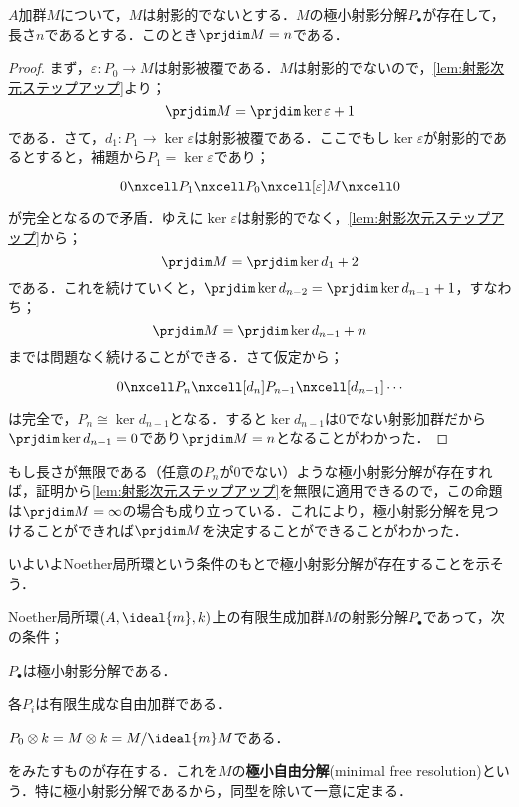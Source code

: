\begin{prop}
	$A$加群$M$について，$M$は射影的でないとする．$M$の極小射影分解$P_\bullet$が存在して，長さ$n$であるとする．このとき$\prjdim M=n$である．
\end{prop}

\begin{proof}
	まず，$\varepsilon:P_0\to M$は射影被覆である．$M$は射影的でないので，\ref{lem:射影次元ステップアップ}より；
	\[\prjdim M=\prjdim\ker\varepsilon+1\]
	である．さて，$d_1:P_1\to\ker\varepsilon$は射影被覆である．ここでもし$\ker\varepsilon$が射影的であるとすると，補題から$P_1=\ker\varepsilon$であり；
	\[\begin{tikzcd}
	0\nxcell P_1\nxcell P_0\nxcell[\varepsilon]M\nxcell0 
	\end{tikzcd}\]
	が完全となるので矛盾．ゆえに$\ker\varepsilon$は射影的でなく，\ref{lem:射影次元ステップアップ}から；
	\[\prjdim M=\prjdim \ker d_1+2\]
	である．これを続けていくと，$\prjdim \ker d_{n-2}=\prjdim \ker d_{n-1}+1$，すなわち；
	\[\prjdim M=\prjdim \ker d_{n-1}+n\]
	までは問題なく続けることができる．さて仮定から；
	\[\begin{tikzcd}
	0\nxcell P_n\nxcell[d_n]P_{n-1}\nxcell[d_{n-1}]\cdots 
	\end{tikzcd}\]
	は完全で，$P_n\cong\ker d_{n-1}$となる．すると$\ker d_{n-1}$は$0$でない射影加群だから$\prjdim\ker d_{n-1}=0$であり$\prjdim M=n$となることがわかった．
\end{proof}

もし長さが無限である（任意の$P_n$が$0$でない）ような極小射影分解が存在すれば，証明から\ref{lem:射影次元ステップアップ}を無限に適用できるので，この命題は$\prjdim M=\infty$の場合も成り立っている．これにより，極小射影分解を見つけることができれば$\prjdim M$を決定することができることがわかった．

いよいよNoether局所環という条件のもとで極小射影分解が存在することを示そう．

\begin{thm}[極小自由分解]\label{thm:極小自由分解}
	Noether局所環$(A,\ideal{m},k)$上の有限生成加群$M$の射影分解$P_\bullet$であって，次の条件；
	\begin{sakura}
		\item $P_\bullet$は極小射影分解である．
		\item 各$P_i$は有限生成な自由加群である．
		\item $P_0\otimes k=M\otimes k=M/\ideal{m}M$である．
	\end{sakura}
	をみたすものが存在する．これを$M$の\textbf{極小自由分解}(minimal free resolution)という．特に極小射影分解であるから，同型を除いて一意に定まる．
\end{thm}

